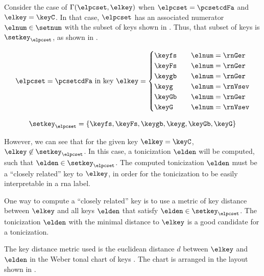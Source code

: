 
Consider the case of $\Gamma(\elpcset, \elkey)$ when
$\elpcset = \pcsetcdFa$ and $\elkey = \keyC$. In that case,
$\elpcset$ has an associated numerator $\elnum \in \setnum$
with the subset of keys shown in .
Thus, that subset of keys is $\setkey_\elpcset$, as shown in
. 

\begin{equation}
    \label{eq:key_not_found}
    \elpcset = \pcsetcdFa \text{ in key } \elkey =
    \begin{cases}
        \keyfs & \quad \elnum = \rnGer \\
        \keyFs & \quad \elnum = \rnGer \\
        \keygb & \quad \elnum = \rnGer \\
        \keyg  & \quad \elnum = \rnVsev \\
        \keyGb & \quad \elnum = \rnGer \\
        \keyG  & \quad \elnum = \rnVsev \\
    \end{cases}
\end{equation}

\begin{equation}
    \label{eq:key_not_found2}
    \setkey_\elpcset = \{ \keyfs, \keyFs, \keygb, \keyg, \keyGb, \keyG \}
\end{equation}

However, we can see that for the given key $\elkey = \keyC$,
$\elkey \not\in \setkey_\elpcset$. In this case, a
tonicization $\elden$ will be computed, such that $\elden
\in \setkey_\elpcset$. The computed tonicization $\elden$
must be a ``closely related'' key to $\elkey$, in order for
the tonicization to be easily interpretable in a \gls{rna}
label.

One way to compute a ``closely related'' key is to use a
metric of key distance between $\elkey$ and all keys
$\elden$ that satisfy $\elden \in \setkey_\elpcset$. The
tonicization $\elden$ with the minimal distance to $\elkey$
is a good candidate for a tonicization.

The key distance metric used is the euclidean distance $d$
between $\elkey$ and $\elden$ in the Weber tonal chart of
keys \parencite{weber1818versuch}. The chart is arranged in
the layout shown in .


